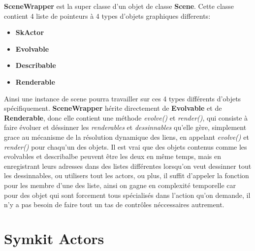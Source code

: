 \documentclass{report}
\begin{document}
\textbf{SceneWrapper} est la super classe d'un objet de classe \textbf{Scene}. 
Cette classe contient 4 liste de pointeurs à 4 types d'objets graphiques differents:
\begin{itemize}
\item \textbf{SkActor}
\item \textbf{Evolvable}
\item \textbf{Describable}
\item \textbf{Renderable}
\end{itemize}
Ainsi une instance de scene pourra travailler sur ces 4 types différents d'objets spécifiquement.
\textbf{SceneWrapper} hérite directement de \textbf{Evolvable} et de \textbf{Renderable}, donc elle contient une méthode \textit{evolve()} et \textit{render()}, qui consiste à faire évoluer et déssinner
les \textit{renderables} et \textit{dessinnables} qu'elle gère, simplement grace au mécanisme de la résolution dynamique des liens, en appelant \textit{evolve()} et \textit{render()} pour chaqu'un des objets.
Il est vrai que des objets contenus comme les evolvables et describalbe peuvent être les deux en même temps, mais en enregistrant leurs adresses dans des listes différentes
lorsqu'on veut dessinner tout les dessinnables, ou utilisers tout les actors, ou plus, il suffit d'appeler la fonction pour les membre d'une des liste, ainsi on gagne en complexité temporelle
car pour des objet qui sont forcement tous spécialisés dans l'action qu'on demande, il n'y a pas besoin de faire tout un tas de contrôles néccessaires autrement.
 
 
\section {Symkit Actors}
\end{document}
